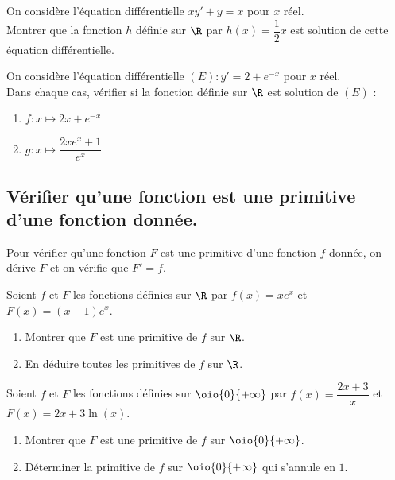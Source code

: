\documentclass[a4paper,11pt,exos]{nsi} %
\begin{document}
\exo{}
On considère l'équation différentielle $xy'+y = x$ pour $x$ réel.\\
Montrer que la fonction $h$ définie sur $\R$ par $h(x)=\dfrac{1}{2}x$ est solution de cette équation différentielle.

\exo{}
On considère l'équation différentielle $(E) : y' = 2+e^{-x}$ pour $x$ réel.\\
Dans chaque cas, vérifier si la fonction définie sur $\R$ est solution de $(E)$ :
\begin{multicols}{2}
    \begin{enumerate}
        \item $f:x\mapsto 2x+e^{-x}$
        \item $g:x\mapsto \dfrac{2xe^x+1}{e^x}$
    \end{enumerate}
\end{multicols}

\subsection*{Vérifier qu'une fonction est une primitive d'une fonction donnée.}

\begin{methode}
Pour vérifier qu'une fonction $F$ est une primitive d'une fonction $f$ donnée, on dérive $F$ et on vérifie que $F'=f$.
\end{methode}

\exo{}
Soient $f$ et $F$ les fonctions définies sur $\R$ par $f(x)= xe^x$ et $F(x)= (x-1)e^x$.
\begin{enumerate}
    \item Montrer que $F$ est une primitive de $f$ sur $\R$.
    \item En déduire toutes les primitives de $f$ sur $\R$.
\end{enumerate}

\exo{}
Soient $f$ et $F$ les fonctions définies sur $\oio{0}{+\infty}$ par $f(x)= \dfrac{2x+3}{x}$ et $F(x)=2x+3\ln(x)$.
\begin{enumerate}
    \item Montrer que $F$ est une primitive de $f$ sur $\oio{0}{+\infty}$.
    \item Déterminer la primitive de $f$ sur $\oio{0}{+\infty}$ qui s'annule en $1$.
\end{enumerate}
\end{document}
